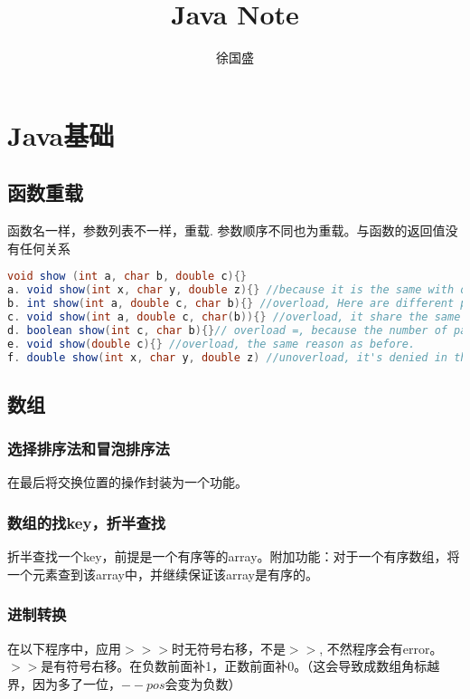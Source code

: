 \documentclass[UTF8]{ctexart}
\title{Java Note}
\author{徐国盛}
\begin{document}
\maketitle
\tableofcontents
\section{Java基础}
\subsection{函数重载}
函数名一样，参数列表不一样，重载. 参数顺序不同也为重载。与函数的返回值没有任何关系
\begin{lstlisting}[language = Java]
void show (int a, char b, double c){}
a. void show(int x, char y, double z){} //because it is the same with original funciton
b. int show(int a, double c, char b){} //overload, Here are different parameter types
c. void show(int a, double c, char(b)){} //overload, it share the same reason as before
d. boolean show(int c, char b){}// overload =, because the number of parameters is different.
e. void show(double c){} //overload, the same reason as before.
f. double show(int x, char y, double z) //unoverload, it's denied in the same class
\end{lstlisting}
\subsection{数组}
\subsubsection{选择排序法和冒泡排序法}
在最后将交换位置的操作封装为一个功能。
%


\subsubsection{数组的找key，折半查找}
折半查找一个key，前提是一个有序等的array。附加功能：对于一个有序数组，将一个元素查到该array中，并继续保证该array是有序的。

\subsubsection{进制转换}
在以下程序中，应用$>>>$时无符号右移，不是$>>$, 不然程序会有error。$>>$是有符号右移。在负数前面补1，正数前面补0。（这会导致成数组角标越界，因为多了一位，$--pos$会变为负数）

\end{document}
